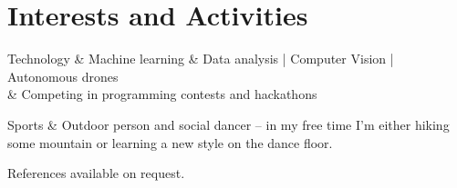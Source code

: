 \documentclass[11pt,a4paper]{article}
\begin{document}
\section*{Interests and Activities}
  \begin {tabu} {} %
    Technology
      & Machine learning \& Data analysis | Computer Vision | Autonomous drones \\
      & Competing in programming contests and hackathons
  \end{tabu}

  \begin{tabu}{}
    Sports
      & Outdoor person and social dancer -- in my free time I'm either hiking some mountain or learning a new style on the dance floor.
  \end{tabu}

\vspace{1em}
References available on request.
\end{document}
